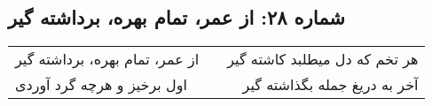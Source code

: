\begin{center}
\section*{شماره ۲۸: از عمر، تمام بهره، برداشته گیر}
\label{sec:028}
\begin{longtable}{l p{0.5cm} r}
از عمر، تمام بهره، برداشته گیر
&&
هر تخم که دل میطلبد کاشته گیر
\\
اول برخیز و هرچه گرد آوردی
&&
آخر به دریغ جمله بگذاشته گیر
\\
\end{longtable}
\end{center}
